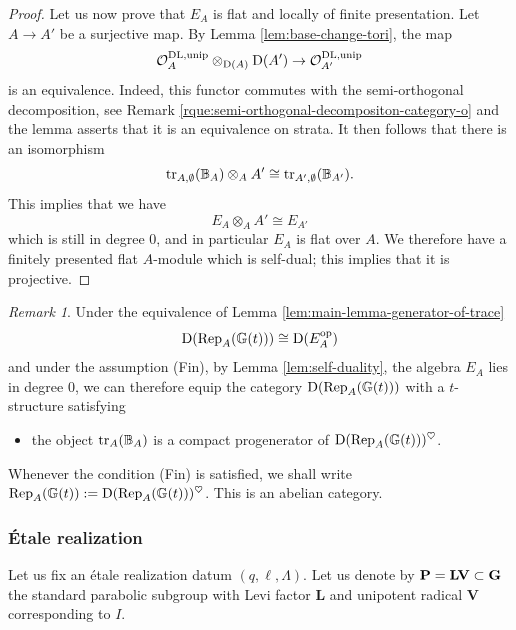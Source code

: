\documentclass[a4paper, 10pt, oneside, reqno]{amsart}
\theoremstyle{plain}
\theoremstyle{definition}
\theoremstyle{remark}
\newtheorem{rque}[thm]{Remark}
\newcommand{\Gbb}{\mathbb{G}}
\newcommand{\opp}{\mathrm{op}}
\newcommand{\Lbf}{\mathbf{L}}
\newcommand{\Pbf}{\mathbf{P}}
\newcommand{\Vbf}{\mathbf{V}}
\begin{document}
\begin{proof}
Let us now prove that $E_A$ is flat and locally of finite presentation. Let $A \to A'$ be a surjective map. By Lemma \ref{lem:base-change-tori}, the map 
$$\mathcal{O}^{\mathrm{DL}, \mathrm{unip}}_A \otimes_{\mathrm{D}(A)} \mathrm{D}(A') \to \mathcal{O}^{\mathrm{DL},\mathrm{unip}}_{A'}$$ 
is an equivalence. Indeed, this functor commutes with the semi-orthogonal decomposition, see Remark \ref{rque:semi-orthogonal-decompositon-category-o} and the lemma asserts that it is an equivalence on strata. It then follows that there is an isomorphism 
$$\mathrm{tr}_{A, \emptyset}(\mathbb{B}_A) \otimes_A A' \cong \mathrm{tr}_{A',\emptyset}(\mathbb{B}_{A'}).$$
This implies that we have 
$$E_A \otimes_A A'  \cong E_{A'}$$ 
which is still in degree $0$, and in particular $E_A$ is flat over $A$. We therefore have a finitely presented flat $A$-module which is self-dual; this implies that it is projective. 
\end{proof}

\begin{rque}\label{rque:t-structure}
Under the equivalence of Lemma \ref{lem:main-lemma-generator-of-trace}
$$\DD(\Rep_{A}(\Gbb(t))) \cong \DD(E_A^{\opp})$$ 
and under the assumption (Fin), by Lemma \ref{lem:self-duality}, the algebra $E_A$ lies in degree $0$, we can therefore equip the category $\DD(\Rep_A(\Gbb(t)))$ with a $t$-structure satisfying 
\begin{itemize}
\item the object $\mathrm{tr}_A(\mathbb{B}_A)$ is a compact progenerator of $\DD(\Rep_{A}(\Gbb(t)))^{\heartsuit}$.
\end{itemize}
Whenever the condition (Fin) is satisfied, we shall write $\Rep_A(\Gbb(t)) := \DD(\Rep_{A}(\Gbb(t)))^{\heartsuit}$. This is an abelian category.
\end{rque}

\subsubsection{\'{E}tale realization}
Let us fix an étale realization datum $(q, \ell, \Lambda)$. Let us denote by $\Pbf = \Lbf\Vbf \subset \Gbf$ the standard parabolic subgroup with Levi factor $\Lbf$ and unipotent radical $\Vbf$ corresponding to $I$. 
\end{document}
